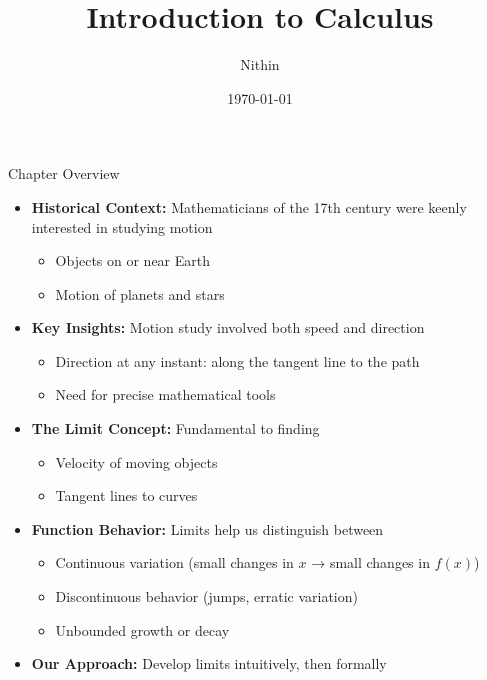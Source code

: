 \documentclass{beamer}
\title{Introduction to Calculus}
\author{Nithin}
\institute{}
\date{\today}
\begin{document}
\begin{frame}
  \titlepage
\end{frame}
\begin{frame}
  \tableofcontents
\end{frame}


\begin{frame}{Chapter Overview}
\begin{itemize}
    \item<1-> \textbf{Historical Context:} Mathematicians of the 17th century were keenly interested in studying motion
    \begin{itemize}
        \item Objects on or near Earth
        \item Motion of planets and stars
    \end{itemize}
    
    \item<2-> \textbf{Key Insights:} Motion study involved both speed and direction
    \begin{itemize}
        \item Direction at any instant: along the tangent line to the path
        \item Need for precise mathematical tools
    \end{itemize}
    
    \item<3-> \textbf{The Limit Concept:} Fundamental to finding
    \begin{itemize}
        \item Velocity of moving objects
        \item Tangent lines to curves
    \end{itemize}
    
    \item<4-> \textbf{Function Behavior:} Limits help us distinguish between
    \begin{itemize}
        \item Continuous variation (small changes in $x$ → small changes in $f(x)$)
        \item Discontinuous behavior (jumps, erratic variation)
        \item Unbounded growth or decay
    \end{itemize}
    
    \item<5-> \textbf{Our Approach:} Develop limits intuitively, then formally
\end{itemize}
\end{frame}
\end{document}
